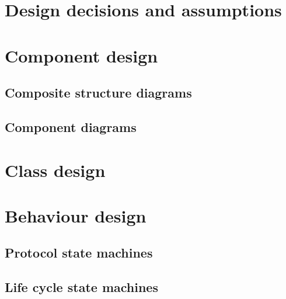\section{Design decisions and assumptions}


\section{Component design}

\subsection{Composite structure diagrams}


\subsection{Component diagrams}


\section{Class design}


\section{Behaviour design}
\subsection{Protocol state machines}


\subsection{Life cycle state machines}
